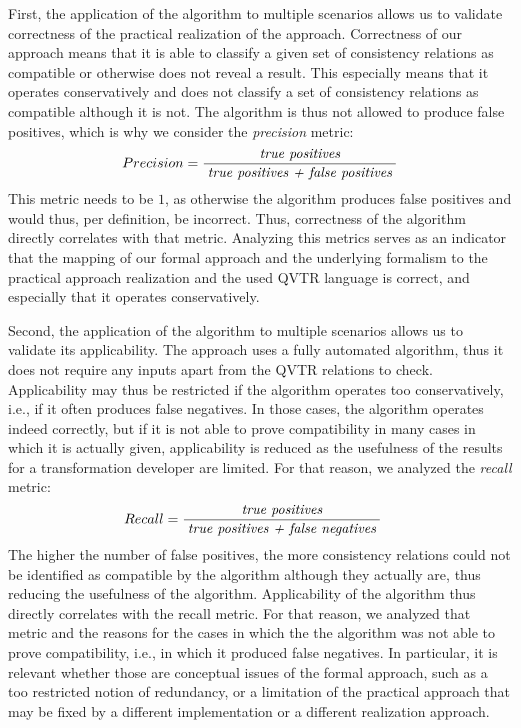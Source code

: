 First, the application of the algorithm to multiple scenarios allows us to validate correctness of the practical realization of the approach.
Correctness of our approach means that it is able to classify a given set of consistency relations as compatible or otherwise does not reveal a result.
This especially means that it operates conservatively and does not classify a set of consistency relations as compatible although it is not.
The algorithm is thus not allowed to produce false positives, which is why we consider the \emph{precision} metric:
\begin{align*}
    \hspace{1em} &
    Precision = \frac{\; \textit{true positives} \;}{\; \textit{true positives + false positives} \;}
\end{align*}
This metric needs to be $1$, as otherwise the algorithm produces false positives and would thus, per definition, be incorrect.
Thus, correctness of the algorithm directly correlates with that metric.
Analyzing this metrics serves as an indicator that the mapping of our formal approach and the underlying formalism to the practical approach realization and the used \gls{QVTR} language is correct, and especially that it operates conservatively.

Second, the application of the algorithm to multiple scenarios allows us to validate its applicability.
The approach uses a fully automated algorithm, thus it does not require any inputs apart from the \gls{QVTR} relations to check.
Applicability may thus be restricted if the algorithm operates too conservatively, i.e., if it often produces false negatives.
In those cases, the algorithm operates indeed correctly, but if it is not able to prove compatibility in many cases in which it is actually given, applicability is reduced as the usefulness of the results for a transformation developer are limited.
For that reason, we analyzed the \emph{recall} metric:
\begin{align*}
    &
    Recall = \frac{\; \textit{true positives} \;}{\; \textit{true positives + false negatives} \;}
\end{align*}
The higher the number of false positives, the more consistency relations could not be identified as compatible by the algorithm although they actually are, thus reducing the usefulness of the algorithm.
Applicability of the algorithm thus directly correlates with the recall metric.
For that reason, we analyzed that metric and the reasons for the cases in which the the algorithm was not able to 
prove compatibility, i.e., in which it produced false negatives.
In particular, it is relevant whether those are conceptual issues of the formal approach, such as a too restricted notion of redundancy, or a limitation of the practical approach that may be fixed by a different implementation or a different realization approach.

